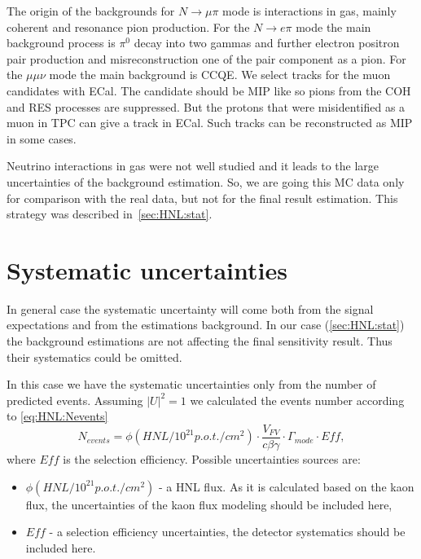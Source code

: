 \documentclass[../main.tex]{subfiles}
\begin{document}
The origin of the backgrounds for $N\to\mu\pi$ mode is interactions in gas, mainly coherent and resonance pion production. For the $N\to e\pi$ mode the main background process is $\pi^0$ decay into two gammas and further electron positron pair production and misreconstruction one of the pair component as a pion. For the $\mu\mu\nu$ mode the main background is CCQE. We select tracks for the muon candidates with ECal. The candidate should be MIP like so pions from the COH and RES processes are suppressed. But the protons that were misidentified as a muon in TPC can give a track in ECal. Such tracks can be reconstructed as MIP in some cases.

Neutrino interactions in gas were not well studied and it leads to the large uncertainties of the background estimation. So, we are going this MC data only for comparison with the real data, but not for the final result estimation. This strategy was described in~\autoref{sec:HNL:stat}.

\section{Systematic uncertainties}
\label{sec:HNL:sys}
In general case the systematic uncertainty will come both from the signal expectations and from the estimations background. In our case (\autoref{sec:HNL:stat}) the background estimations are not affecting the final sensitivity result. Thus their systematics could be omitted.

In this case we have the systematic uncertainties only from the number of predicted events. Assuming $\left|U\right|^2=1$ we calculated the events number according to \autoref{eq:HNL:Nevents}
\begin{equation}
  N_{events}=\phi(HNL/10^{21}p.o.t./cm^2)\cdot\frac{V_{FV}}{c\beta\gamma}\cdot\Gamma_{mode}\cdot Eff,
\end{equation}
where $Eff$ is the selection efficiency. Possible uncertainties sources are:
\begin{itemize}
  \item $\phi(HNL/10^{21}p.o.t./cm^2)$ - a HNL flux. As it is calculated based on the kaon flux, the uncertainties of the kaon flux modeling should be included here,
  \item $Eff$ - a selection efficiency uncertainties, the detector systematics should be included here.
\end{itemize}
\end{document}
